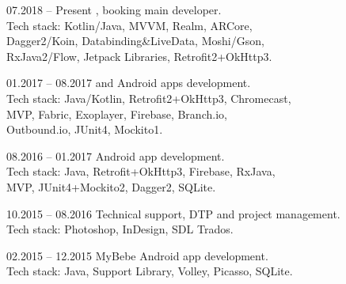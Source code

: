 \documentclass[12pt, a4paper]{article}
\begin{document}
\begin{minipage}[t]{0.6\textwidth}
    
    \begin{subsec}{}{07.2018 – Present}
        \> , booking main developer. \\
        \> Tech stack: Kotlin/Java, MVVM, Realm, ARCore, \\
        \> Dagger2/Koin, Databinding\&LiveData, Moshi/Gson, \\
        \> RxJava2/Flow, Jetpack Libraries, Retrofit2+OkHttp3. \\
    \end{subsec}
    
    \begin{subsec}{}{01.2017 – 08.2017}
        \>  and  Android apps development. \\
        \> Tech stack: Java/Kotlin, Retrofit2+OkHttp3, Chromecast, \\
        \> MVP, Fabric, Exoplayer, Firebase, Branch.io, \\
        \> Outbound.io, JUnit4, Mockito1. \\
    \end{subsec}
    
    \begin{subsec}{}{08.2016 – 01.2017}
        \>  Android app development. \\
        \> Tech stack: Java, Retrofit+OkHttp3, Firebase, RxJava, \\
        \> MVP, JUnit4+Mockito2, Dagger2, SQLite. \\
    \end{subsec}
    
    \begin{subsec}{}{10.2015 – 08.2016}
        \> Technical support, DTP and project management. \\
        \> Tech stack: Photoshop, InDesign, SDL Trados. \\
    \end{subsec}
     
    \begin{subsec}{}{02.2015 – 12.2015}
        \> MyBebe Android app development. \\
        \> Tech stack: Java, Support Library, Volley, Picasso, SQLite. \\
    \end{subsec}
    

\end{minipage}
\end{document}

